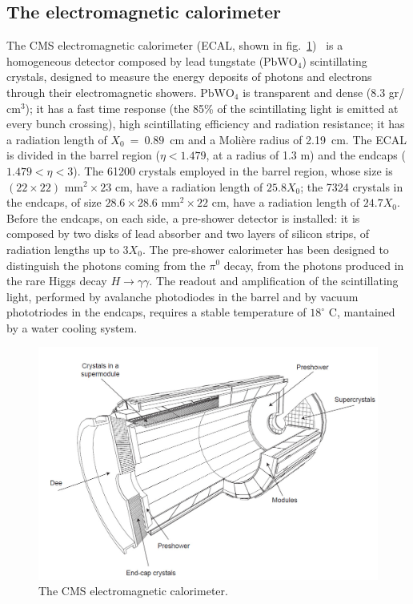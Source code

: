 \subsection{The electromagnetic calorimeter}
The CMS electromagnetic calorimeter (ECAL, shown in fig.~\ref{fig:CMS_ecal})~\cite{ECAL-TDR} is a homogeneous detector composed by lead tungstate ($\text{PbWO}_4$) scintillating crystals, designed to measure the energy deposits of photons and electrons through their electromagnetic showers. $\text{PbWO}_4$ is transparent and dense (8.3 gr/$\text{cm}^3$); it has a fast time response (the 85\% of the scintillating light is emitted at every bunch crossing), high scintillating efficiency and radiation resistance; it has a radiation length of $X_0~=~0.89$~cm and a Moli\`ere radius of 2.19~cm. The ECAL is divided in the barrel region ($\eta < 1.479$, at a radius of 1.3 m) and the endcaps ($1.479 < \eta < 3$).  The 61200 crystals employed in the barrel region, whose size is $(22 \times 22) \text{ mm}^2 \times 23 \text{ cm}$, have a radiation length of $25.8 X_0$; the 7324 crystals in the endcaps, of size $ 28.6 \times 28.6 \text{ mm}^2 \times 22 \text{ cm}$, have a radiation length of $24.7 X_0$. Before the endcaps, on each side, a pre-shower detector is installed: it is composed by two disks of lead absorber and two layers of silicon strips, of radiation lengths up to $3X_0$. The pre-shower calorimeter has been designed to distinguish the photons coming from the $\pi^0$ decay, from the photons produced in the rare Higgs decay $H \rightarrow \gamma \gamma$. The readout and amplification of the scintillating light, performed by avalanche photodiodes in the barrel and by vacuum phototriodes in the endcaps, requires a stable temperature of $18^{\circ}$ C, mantained by a water cooling system.

\begin{figure}[!htb]
  \centering
    \includegraphics[width=.7\textwidth]{figures/cmsecal.png}
  \caption{The CMS electromagnetic calorimeter.}
  \label{fig:CMS_ecal}
\end{figure}


